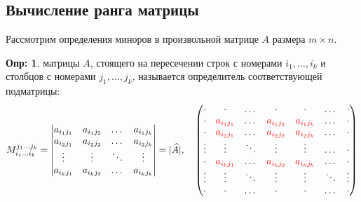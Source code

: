 \documentclass[12pt]{article}
\theoremstyle{definition}
\newtheorem{defn}{Опр:}
\newcommand{\wht}[1]{\widehat{#1}}
\begin{document}
\subsection*{Вычисление ранга матрицы}
Рассмотрим определения миноров в произвольной матрице $A$ размера $m \times n$.
\begin{defn}
	 матрицы $A$, стоящего на пересечении строк с номерами $i_1,\dotsc,i_k$ и столбцов с номерами $j_1,\dotsc, j_k$, называется определитель соответствующей подматрицы:
	$$
		M_{i_1 \dotsc i_k}^{j_1 \dotsc j_k} = 
		\begin{vmatrix}
			a_{i_1 j_1} & a_{i_1 j_2} & \dotsc & a_{i_1 j_k}\\
			a_{i_2 j_1} & a_{i_2 j_2} & \dotsc & a_{i_2 j_k}\\
			\vdots & \vdots & \ddots & \vdots\\
			a_{i_k j_1} & a_{i_k j_2} & \dotsc & a_{i_k j_k}\\
		\end{vmatrix} = |\wht{A}|, \quad 
		\begin{pmatrix}
			\cdot & \cdot & \dotsc & \cdot  & \cdot& \dotsc & \cdot\\
			\cdot & \color{red}a_{i_1 j_1} & \dotsc & \color{red}a_{i_1 j_2}  & \color{red}a_{i_1 j_k} & \dotsc & \cdot\\
			\cdot & \color{red}a_{i_2 j_1} & \dotsc & \color{red}a_{i_2 j_2}  & \color{red}a_{i_2 j_k} & \dots & \cdot\\
			\vdots & \vdots & \ddots & \vdots  & \vdots& \dotsc & \cdot\\
			\cdot & \color{red}a_{i_k j_1} & \dotsc & \color{red}a_{i_k j_2}  & \color{red}a_{i_k j_k} & \dotsc & \cdot\\
			\vdots & \vdots & \ddots & \vdots  & \vdots& \ddots & \vdots\\
			\cdot & \cdot & \dotsc & \cdot  & \cdot & \dotsc & \cdot
		\end{pmatrix}
	$$
\end{defn}
\end{document}

